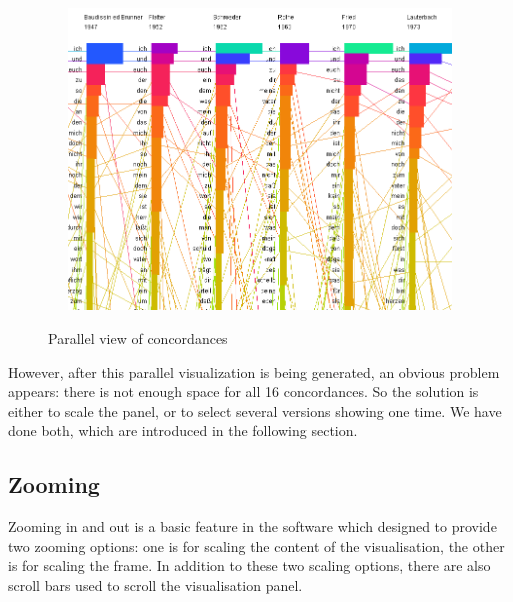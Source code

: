 \begin{figure}[h]
	\centering	
	\includegraphics[width=13cm, height=8cm]{Figs/Parallel-Vis}\\[1ex]
	\caption{Parallel view of concordances}
	\label{fig:parallelConcor}
\end{figure} 


However, after this parallel visualization is being generated, an obvious problem appears: there is not enough space for all 16 concordances. So the solution is either to scale the panel, or to select several versions showing one time. We have done both, which are introduced in the following section. 

\subsection{Zooming}

Zooming in and out is a basic feature in the software which designed to provide two zooming options: one is for scaling the content of the visualisation, the other is for scaling the frame. In addition to these two scaling options, there are also scroll bars used to scroll the visualisation panel.

